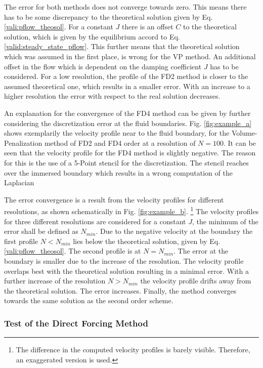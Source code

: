 The error for both methods does not converge towards zero. This means there has to be some discrepancy to the theoretical solution given by
Eq. \ref{vali:pflow_theosol}.
For a constant $J$ there is an offset $C$ to the theoretical solution,
which is given by the equilibrium accord to Eq.  \ref{valid:steady_state_pflow}.
This further means that the theoretical solution which was assumed in the first place, is wrong for the VP method.
An additional offset in the flow which is dependent on the damping coefficient $J$ has to be considered.
For a low resolution, the profile of the FD2  method is closer to the assumed theoretical one, which results in a smaller
error. With an increase to a higher resolution the error with respect to the real solution decreases.

An explanation for the convergence of the FD4 method can be given by further considering the discretization error at the fluid boundaries.
Fig. \ref{fig:example_a} shows exemplarily the velocity profile near to the fluid boundary, for the Volume-Penalization method of FD2 and FD4 order
at a resolution of $N=100$.
It can be seen that the velocity profile for the FD4  method  is slightly negative.
The reason for this is the use of a 5-Point stencil for the discretization.
The stencil reaches over the immersed boundary which results in a wrong computation of the Laplacian

The  error convergence is a result from  the velocity profiles for different resolutions,
as shown schematically in Fig. \ref{fig:example_b}.
\footnote{The difference in the computed velocity profiles is barely visible. Therefore, an exaggerated version is used.}
The velocity profiles for three different resolutions are considered for a constant $J$,
the minimum of the error shall be defined as $N_{min}$.
Due to the negative velocity at the boundary the first profile $N<N_{min}$ lies below the theoretical solution,
given by Eq. \ref{vali:pflow_theosol}.
The second profile is at $N=N_{min}$. The error at the boundary is smaller due to the increase of the resolution.
The velocity profile overlaps best with the theoretical solution resulting in a minimal error.
With a further increase of the resolution  $N>N_{min}$ the velocity profile drifts away from the theoretical solution.
The error increases.  Finally, the method converges towards the same solution as the second order scheme.


\subsubsection{Test of the Direct Forcing Method}

